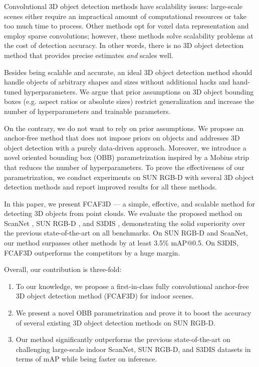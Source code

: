 \documentclass[runningheads]{llncs}
\begin{document}
Convolutional 3D object detection methods have scalability issues: large-scale scenes either require an impractical amount of computational resources or take too much time to process. Other methods opt for voxel data representation and employ sparse convolutions; however, these methods solve scalability problems at the cost of detection accuracy. In other words, there is no 3D object detection method that provides precise estimates \emph{and} scales well.

Besides being scalable and accurate, an ideal 3D object detection method should handle objects of arbitrary shapes and sizes without additional hacks and hand-tuned hyperparameters. We argue that prior assumptions on 3D object bounding boxes (e.g. aspect ratios or absolute sizes) restrict generalization and increase the number of hyperparameters and trainable parameters. %

On the contrary, we do not want to rely on prior assumptions. We propose an anchor-free method that does not impose priors on objects and addresses 3D object detection with a purely data-driven approach. Moreover, we introduce a novel oriented bounding box (OBB) parametrization inspired by a Mobius strip that reduces the number of hyperparameters. To prove the effectiveness of our parametrization, we conduct experiments on SUN RGB-D with several 3D object detection methods and report improved results for all these methods.

In this paper, we present FCAF3D --- a simple, effective, and scalable method for detecting 3D objects from point clouds. We evaluate the proposed method on ScanNet \cite{dai2017scannet}, SUN RGB-D \cite{song2015sunrgbd}, and S3DIS \cite{armeni2016s3dis}, demonstrating the solid superiority over the previous state-of-the-art on all benchmarks. On SUN RGB-D and ScanNet, our method surpasses other methods by at least 3.5\% mAP@0.5. On S3DIS, FCAF3D outperforms the competitors by a huge margin.

Overall, our contribution is three-fold:
\begin{enumerate}
    \item To our knowledge, we propose a first-in-class fully convolutional anchor-free 3D object detection method (FCAF3D) for indoor scenes.
    \item We present a novel OBB parametrization and prove it to boost the accuracy of several existing 3D object detection methods on SUN RGB-D.
    \item Our method significantly outperforms the previous state-of-the-art on challenging large-scale indoor ScanNet, SUN RGB-D, and S3DIS datasets in terms of mAP while being faster on inference.
\end{enumerate}
\end{document}
